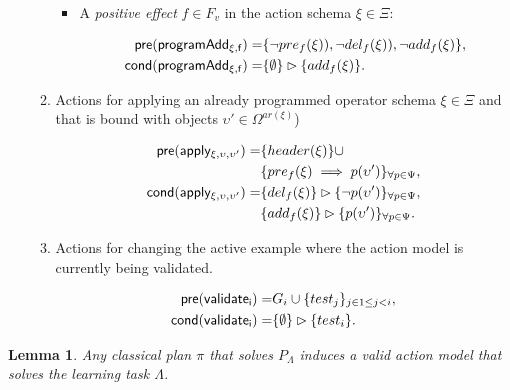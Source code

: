 \documentclass[letterpaper]{article} %
\newcommand{\pre}{\mathsf{pre}}     %
\newcommand{\cond}{\mathsf{cond}}   %
\newtheorem{lemma}[theorem]{Lemma}
\begin{document}
\begin{itemize}
\begin{enumerate}
\begin{itemize}
\item A {\em positive effect} $f\in F_v$ in the action schema $\xi\in\Xi$:
\begin{small}
\begin{align*}
\hspace*{7pt}\pre(\mathsf{programAdd_{\xi,f}})=&\{\neg pre_{f}(\xi)),\neg del_{f}(\xi)),\neg add_{f}(\xi)\},\\                                                   
\cond(\mathsf{programAdd_{\xi,f}})=&\{\emptyset\}\rhd\{add_{f}(\xi)\}.
\end{align*}
\end{small}
\end{itemize}

\item Actions for applying an already programmed operator schema $\xi\in\Xi$ and that is bound with objects $\upsilon'\in\Omega^{ar(\xi)}$)
\begin{small}
\begin{align*}
\hspace*{7pt}\pre(\mathsf{apply_{\xi,\upsilon,\upsilon'}})=&\{header(\xi)\}\cup\\     
                                           &\{pre_{f}(\xi)\implies p(\upsilon')\}_{\forall p\in\Psi},\\
\cond(\mathsf{apply_{\xi,\upsilon,\upsilon'}})=&\{del_{f}(\xi)\}\rhd\{\neg p(\upsilon')\}_{\forall p\in\Psi},\\
&\{add_{f}(\xi)\}\rhd\{p(\upsilon')\}_{\forall p\in\Psi}.
\end{align*}
\end{small}

\item Actions for changing the active example where the action model is currently being validated.
\begin{small}
\begin{align*}
\hspace*{7pt}\pre(\mathsf{validate_{i}})=&G_i\cup\{test_j\}_{j\in 1\leq j<i},\\
\cond(\mathsf{validate_{i}})=&\{\emptyset\}\rhd\{test_i\}.
\end{align*}
\end{small}
\end{enumerate}
\end{itemize}


\begin{lemma}
Any classical plan $\pi$ that solves $P_{\Lambda}$ induces a valid action model that solves the learning task $\Lambda$.
\end{lemma}
\end{document}
